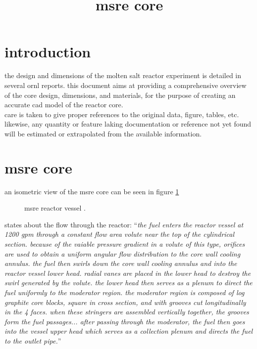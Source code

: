 \documentclass{article}
\title{msre core}
\author{}
\date{}
\newcommand*{\mrsarchive}{../../msr-archive}%
\begin{document}
\maketitle

\section{introduction}
the design and dimensions of the molten salt reactor experiment is detailed in several ornl reports. this document aims at providing a comprehensive overview of the core design, dimensions, and materials, for the purpose of creating an accurate cad model of the reactor core. \\

care is taken to give proper references to the original data, figure, tables, etc. likewise, any quantity or feature laking documentation or reference not yet found will be estimated or extrapolated from the available information.



\section{msre core}
an isometric view of the msre core can be seen in figure \ref{3229-fig1}
\begin{figure}[H]
  \centering
  \caption{msre reactor vessel \parencite[figure 1]{ornl-tm-3229}.}
  \label{3229-fig1}
\end{figure}

\textcite[page 1]{ornl-tm-3229} states about the flow through the reactor:
\enquote{\textit{the fuel enters the reactor vessel at 1200 gpm through a constant flow area volute near the top of the cylindrical section. because of the vaiable pressure gradient in a volute of this type, orifices are used to obtain a uniform angular flow distribution to the core wall cooling annulus. the fuel then swirls down the core wall cooling annulus and into the reactor vessel lower head. radial vanes are placed in the lower head to destroy the swirl generated by the volute. the lower head then serves as a plenum to direct the fuel uniformly to the moderator region. the moderator region is composed of log graphite core blocks, square in cross section, and with grooves cut longitudinally in the 4 faces. when these stringers are assembled vertically together, the grooves form the fuel passages... after passing through the moderator, the fuel then goes into the vessel upper head which serves as a collection plenum and directs the fuel to the outlet pipe.}}
\end{document}
